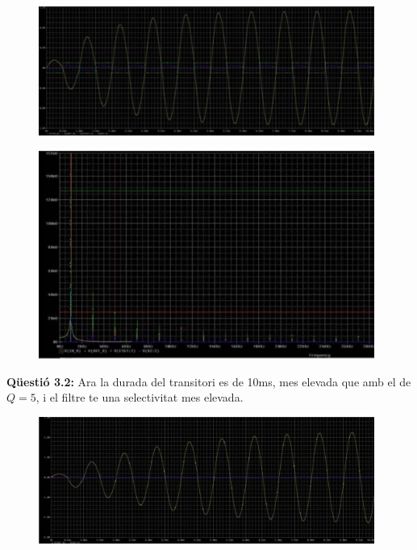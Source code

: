 \documentclass[12pt, a4papre]{article}
\begin{document}
	\begin{figure}[H]
		\begin{center}
		\includegraphics[width=110mm]{3_1_1.png}
		\end{center}
	\end{figure}
	
	\begin{figure}[H]
		\begin{center}
		\includegraphics[width=110mm]{3_1_2.png}
		\end{center}
	\end{figure}
	
	\textbf{Qüestió 3.2:} Ara la durada del transitori es de 10ms, mes elevada que amb el de $Q = 5$, i el filtre te una selectivitat mes elevada.
	
	\begin{figure}[H]
		\begin{center}
		\includegraphics[width=110mm]{3_2_1.png}
		\end{center}
	\end{figure}
	
\end{document}

